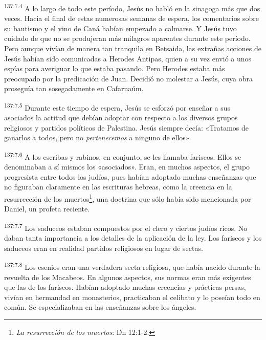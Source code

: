 \par
\textsuperscript{137:7.4} A lo largo de todo este período, Jesús no habló en la sinagoga más que dos veces. Hacia el final de estas numerosas semanas de espera, los comentarios sobre su bautismo y el vino de Caná habían empezado a calmarse. Y Jesús tuvo cuidado de que no se produjeran más milagros aparentes durante este período. Pero aunque vivían de manera tan tranquila en Betsaida, las extrañas acciones de Jesús habían sido comunicadas a Herodes Antipas, quien a su vez envió a unos espías para averiguar lo que estaba pasando. Pero Herodes estaba más preocupado por la predicación de Juan. Decidió no molestar a Jesús, cuya obra proseguía tan sosegadamente en Cafarnaúm.

\par
\textsuperscript{137:7.5} Durante este tiempo de espera, Jesús se esforzó por enseñar a sus asociados la actitud que debían adoptar con respecto a los diversos grupos religiosos y partidos políticos de Palestina. Jesús siempre decía: «Tratamos de ganarlos a todos, pero no \textit{pertenecemos} a ninguno de ellos».

\par
\textsuperscript{137:7.6} A los escribas y rabinos, en conjunto, se les llamaba fariseos. Ellos se denominaban a sí mismos los «asociados». Eran, en muchos aspectos, el grupo progresista entre todos los judíos, pues habían adoptado muchas enseñanzas que no figuraban claramente en las escrituras hebreas, como la creencia en la resurrección de los muertos\footnote{\textit{La resurrección de los muertos}: Dn 12:1-2.}, una doctrina que sólo había sido mencionada por Daniel, un profeta reciente.

\par
\textsuperscript{137:7.7} Los saduceos estaban compuestos por el clero y ciertos judíos ricos. No daban tanta importancia a los detalles de la aplicación de la ley. Los fariseos y los saduceos eran en realidad partidos religiosos en lugar de sectas.

\par
\textsuperscript{137:7.8} Los esenios eran una verdadera secta religiosa, que había nacido durante la revuelta de los Macabeos. En algunos aspectos, sus normas eran más exigentes que las de los fariseos. Habían adoptado muchas creencias y prácticas persas, vivían en hermandad en monasterios, practicaban el celibato y lo poseían todo en común. Se especializaban en las enseñanzas sobre los ángeles.

